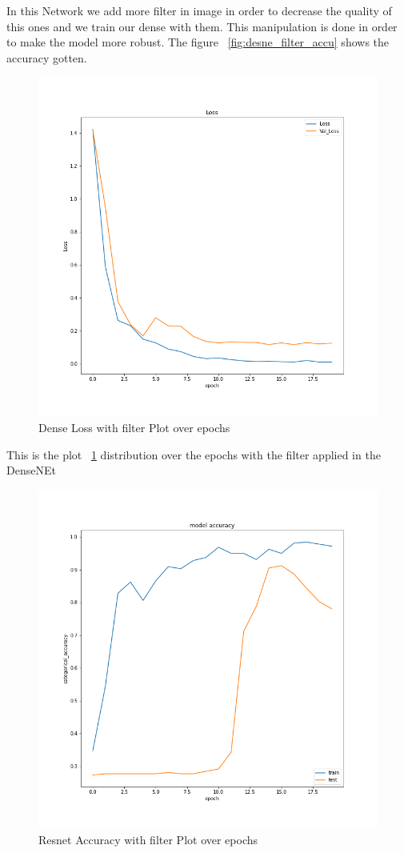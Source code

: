 \documentclass[a4paper]{article}
\begin{document}
 In this Network we add more filter in image in order to decrease the quality of this ones and we train our dense with them. This manipulation is done in order to make the model more robust. The figure ~\ref{fig:desne_filter_accu}
 shows the accuracy gotten.
 \begin{figure}[H]
    \includegraphics[width=\linewidth]{images/history222_loss.png}
            \caption{Dense Loss with filter Plot over epochs}
    \label{fig:desne_filter_loss}
  \end{figure}  
  This is the plot ~\ref{fig:desne_filter_loss} distribution over the epochs with the filter applied in the DenseNEt 
\begin{figure}[H]
    \includegraphics[width=\linewidth]{images/resnet_accu.png}
            \caption{Resnet Accuracy with filter Plot over epochs}
    \label{fig:resnet_accu}
  \end{figure}  
\end{document}
